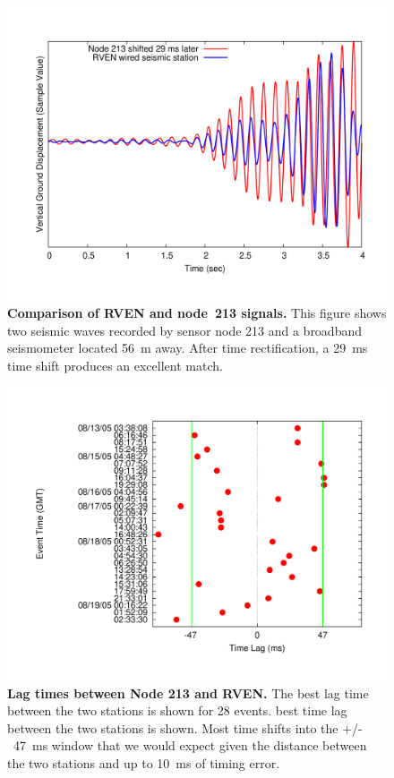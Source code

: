 \begin{figure}[t]
\label{evaluation-fig-rvenv213}
\begin{center}
\includegraphics[width=\hsize]{./5-evaluation/figs/timing/RV213/2005-08-15_09.11.28/213VREFTEK-NEGATIVE29MS-OFFSET.pdf}
\end{center}
\caption{\textbf{Comparison of RVEN and node~213 signals.} 
This figure shows two seismic waves recorded by sensor node 213 and a
broadband seismometer located 56~m away. After time rectification, a 29~ms
time shift produces an excellent match.}
\end{figure}

\begin{figure}[t]
\label{evaluation-fig-rvenv213all}
\begin{center}
\includegraphics[width=\hsize]{./5-evaluation/figs/timing/RV213/Table/213-GOODDIFFS2.pdf}
\end{center}
\caption{\textbf{Lag times between Node 213 and RVEN.}
The best lag time between the two stations is shown for 28 events.  best time
lag between the two stations is shown.  Most time shifts into the +/-~47~ms
window that we would expect given the distance between the two stations and
up to 10~ms of timing error.}
\end{figure}

